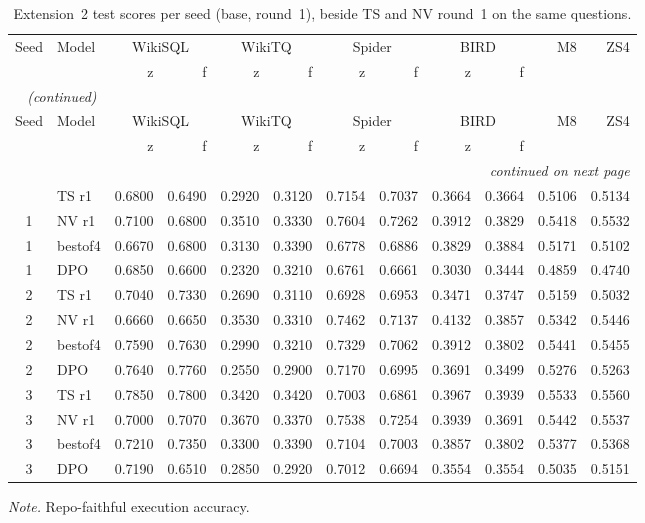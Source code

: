 {\small
{}
\setlength{\tabcolsep}{4.2pt}
\begin{longtable}{@{}clrrrrrrrrrr@{}}
\caption{Extension~2 test scores per seed (base, round~1), beside TS and NV round~1 on the same questions.}\label{tab:gen-ext2-scores}\\
\toprule
\rowcolor{headshade}Seed & Model & \multicolumn{2}{c}{WikiSQL} & \multicolumn{2}{c}{WikiTQ} & \multicolumn{2}{c}{Spider} & \multicolumn{2}{c}{BIRD} & M8 & ZS4\\\rowcolor{headshade} & & z & f & z & f & z & f & z & f & &\\
\midrule
\endfirsthead
\multicolumn{12}{l}{\textit{\tablename~\thetable{} (continued)}}\\
\toprule
\rowcolor{headshade}Seed & Model & \multicolumn{2}{c}{WikiSQL} & \multicolumn{2}{c}{WikiTQ} & \multicolumn{2}{c}{Spider} & \multicolumn{2}{c}{BIRD} & M8 & ZS4\\\rowcolor{headshade} & & z & f & z & f & z & f & z & f & &\\
\midrule
\endhead
\midrule
\multicolumn{12}{r}{\textit{continued on next page}}\\
\endfoot
\bottomrule
\endlastfoot
1 & TS r1 & 0.6800 & 0.6490 & 0.2920 & 0.3120 & 0.7154 & 0.7037 & 0.3664 & 0.3664 & 0.5106 & 0.5134\\
1 & NV r1 & 0.7100 & 0.6800 & 0.3510 & 0.3330 & 0.7604 & 0.7262 & 0.3912 & 0.3829 & 0.5418 & 0.5532\\
1 & bestof4 & 0.6670 & 0.6800 & 0.3130 & 0.3390 & 0.6778 & 0.6886 & 0.3829 & 0.3884 & 0.5171 & 0.5102\\
1 & DPO & 0.6850 & 0.6600 & 0.2320 & 0.3210 & 0.6761 & 0.6661 & 0.3030 & 0.3444 & 0.4859 & 0.4740\\
\midrule
2 & TS r1 & 0.7040 & 0.7330 & 0.2690 & 0.3110 & 0.6928 & 0.6953 & 0.3471 & 0.3747 & 0.5159 & 0.5032\\
2 & NV r1 & 0.6660 & 0.6650 & 0.3530 & 0.3310 & 0.7462 & 0.7137 & 0.4132 & 0.3857 & 0.5342 & 0.5446\\
2 & bestof4 & 0.7590 & 0.7630 & 0.2990 & 0.3210 & 0.7329 & 0.7062 & 0.3912 & 0.3802 & 0.5441 & 0.5455\\
2 & DPO & 0.7640 & 0.7760 & 0.2550 & 0.2900 & 0.7170 & 0.6995 & 0.3691 & 0.3499 & 0.5276 & 0.5263\\
\midrule
3 & TS r1 & 0.7850 & 0.7800 & 0.3420 & 0.3420 & 0.7003 & 0.6861 & 0.3967 & 0.3939 & 0.5533 & 0.5560\\
3 & NV r1 & 0.7000 & 0.7070 & 0.3670 & 0.3370 & 0.7538 & 0.7254 & 0.3939 & 0.3691 & 0.5442 & 0.5537\\
3 & bestof4 & 0.7210 & 0.7350 & 0.3300 & 0.3390 & 0.7104 & 0.7003 & 0.3857 & 0.3802 & 0.5377 & 0.5368\\
3 & DPO & 0.7190 & 0.6510 & 0.2850 & 0.2920 & 0.7012 & 0.6694 & 0.3554 & 0.3554 & 0.5035 & 0.5151\\
\end{longtable}
}
\vspace{-0.6\baselineskip}
{\footnotesize\color{slate}\textit{Note.} Repo-faithful execution accuracy.\par}
\medskip
